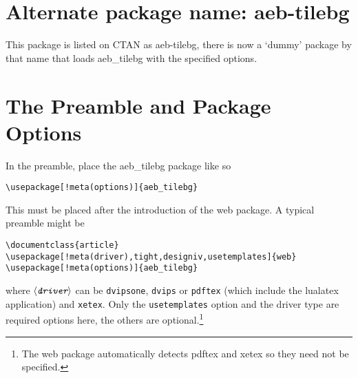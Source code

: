 \documentclass{article}
\def\meta#1{$\langle\textit{\texttt{#1}}\rangle$}
\let\pkg\textsf
\let\amtIndent\parindent %
\begin{document}
\section{Alternate package name: \texorpdfstring{\protect\pkg{aeb-tilebg}}{aeb-tilebg}}

This package is listed on CTAN as \pkg{aeb-tilebg}, there is now a `dummy' package by
that name that loads \pkg{aeb\_tilebg} with the specified options.

\section{The Preamble and Package Options}

In the preamble, place the \textsf{aeb\_tilebg} package like so
\begin{Verbatim}[xleftmargin=\amtIndent,fontsize=\small,commandchars=!()]
\usepackage[!meta(options)]{aeb_tilebg}
\end{Verbatim}
This must be placed after the introduction of the web package. A
typical preamble might be
\begin{Verbatim}[xleftmargin=\amtIndent,fontsize=\small,commandchars=!()]
\documentclass{article}
\usepackage[!meta(driver),tight,designiv,usetemplates]{web}
\usepackage[!meta(options)]{aeb_tilebg}
\end{Verbatim}
where \meta{driver} can be \texttt{dvipsone}, \texttt{dvips} or
\texttt{pdftex} (which include the \textsf{lualatex} application) and
\texttt{xetex}. Only the \texttt{usetemplates} option and the driver type
are required options here, the others are optional.\footnote{The \textsf{web} package
automatically detects \textsf{pdftex} and \textsf{xetex} so they need not be specified.}
\end{document}
